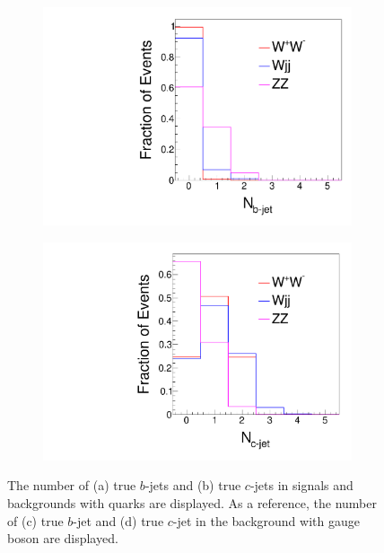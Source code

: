 \documentclass[a4paper,11pt]{article}
\begin{document}
\begin{figure}[htbp]
\begin{subfigure}[t]{0.45\textwidth}
     \includegraphics[width=\linewidth]{nbjets_wz.pdf}
     \caption{}
     \label{fig:nbjets_wz}
  \end{subfigure}
  \begin{subfigure}[t]{0.45\textwidth}
     \includegraphics[width=\linewidth]{ncjets_wz.pdf}
     \caption{}
     \label{fig:ncjets_wz}
  \end{subfigure}
  \caption{The number of (a) true $b$-jets and (b) true $c$-jets in signals and backgrounds with quarks are displayed. As a reference, the number of (c) true $b$-jet and (d) true $c$-jet in the background with gauge boson are displayed.}\label{fig:bcjet}
\end{figure}
\end{document}
